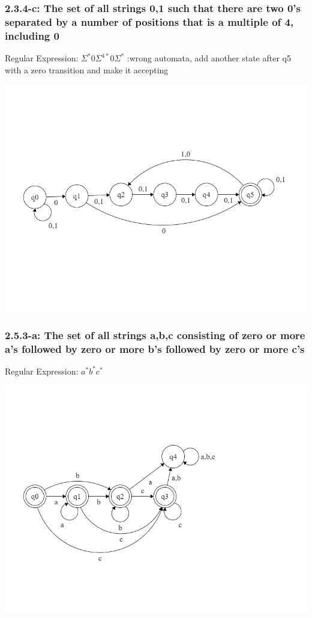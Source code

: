 \documentclass{article}
\theoremstyle{theorem}
\theoremstyle{definition}
\theoremstyle{remark}
\begin{document}
\subsubsection{2.3.4-c: The set of all strings {0,1} such that there are two 0's separated by a number of positions that is a multiple of 4, including 0}
Regular Expression: $\Sigma^*0\Sigma^{4*}0\Sigma^*$ :wrong automata, add another state after q5 with a zero transition and make it accepting

\includegraphics[scale=0.4]{Images/2.3.4c.png}

\subsubsection{2.5.3-a: The set of all strings {a,b,c} consisting of zero or more a's followed by zero or more b's followed by zero or more c's}
Regular Expression: $a^*b^*c^*$

\includegraphics[scale=0.4]{Images/2.5.3a.png}
\end{document}
